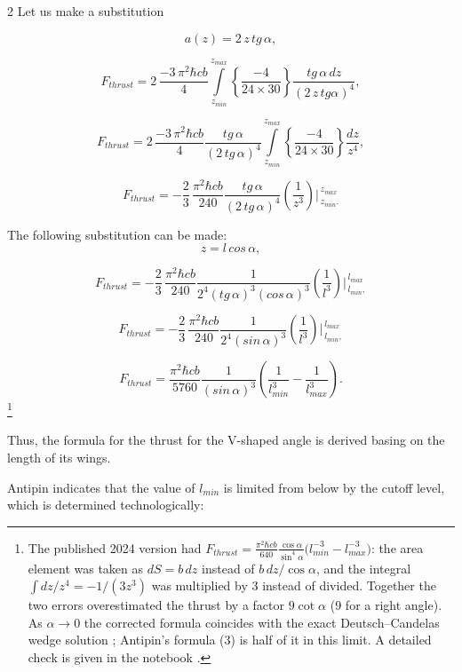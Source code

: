 \documentclass[twoside, 10pt]{article}
\begin{document}
\begin{multicols}{2}
Let us make a substitution

\[a\left(z\right) = 2\,z\,tg\, \alpha,\]

\[F_{thrust} = 2\, \frac{-3\,\pi^2\hbar c b}{4}\int\limits_{z_{min}}^{z_{max}} \left\{\frac{-4}{24\times30}\right\}\frac{tg\, \alpha\,dz}{\left(2\,z\,tg \alpha\right)^4},\]

\[F_{thrust} = 2\, \frac{-3\,\pi^2\hbar c b}{4} \frac{tg\, \alpha}{\left(2\,tg\, \alpha\right)^4} \int\limits_{z_{min}}^{z_{max}} \left\{\frac{-4}{24\times30}\right\} \frac{dz}{z^4},\]

\[F_{thrust} = -\frac{2}{3}\, \frac{\pi^2\hbar c b}{240} \frac{tg\, \alpha}{\left(2\,tg\, \alpha\right)^4} \left(\frac{1}{z^3}\right)\Bigg\rvert_{\,z_{min}.}^{\,z_{max}} \]

    The following substitution can be made: \[z = l\, cos\, \alpha,\]

\[F_{thrust} = -\frac{2}{3}\, \frac{\pi^2\hbar c b}{240} \frac{1}{2^4\left(tg\,\alpha\right)^3\left(cos\, \alpha\right)^3} \left(\frac{1}{l^3}\right)\Bigg\rvert_{\,l_{min},}^{\,l_{max}} \]

\[F_{thrust} = -\frac{2}{3}\, \frac{\pi^2\hbar c b}{240} \frac{1}{2^4\left(sin\, \alpha\right)^3} \left(\frac{1}{l^3}\right)\Bigg\rvert_{\,l_{min},}^{\,l_{max}} \]

\noindent
\begin{equation}F_{thrust} = \frac{\pi^2\hbar c b}{5760} \frac{1}{\left(sin\, \alpha\right)^3} \left(\frac{1}{l_{min}^3} - \frac{1}{l_{max}^3}\right).\end{equation}\footnote{The published 2024 version had \(F_{thrust}=\frac{\pi^2\hbar c b}{640}\frac{\cos\alpha}{\sin^4\alpha}\big(l_{min}^{-3}-l_{max}^{-3}\big)\): the area element was taken as \(dS=b\,dz\) instead of \(b\,dz/\cos\alpha\), and the integral \(\int dz/z^4=-1/(3z^3)\) was multiplied by 3 instead of divided. Together the two errors overestimated the thrust by a factor \(9\cot\alpha\) (9 for a right angle). As \(\alpha\to0\) the corrected formula coincides with the exact Deutsch--Candelas wedge solution \cite{Deutsch1979}; Antipin's formula (3) \cite{Antipin2017} is half of it in this limit. A detailed check is given in the notebook \cite{AngleNotebook}.}

Thus, the formula for the thrust for the \mbox{V-shaped} angle is derived basing on the
length of its wings.

Antipin indicates that the value of \(l_{min}\) is limited from below by
the {\glqq}cutoff{\grqq} level, which is determined technologically:


\end{multicols}
\end{document}
